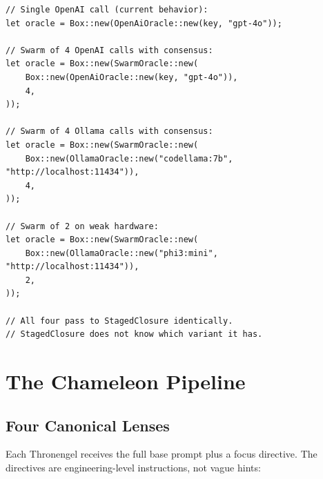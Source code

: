 \documentclass[11pt,a4paper]{article}
\begin{document}
\begin{lstlisting}[style=rust]
// Single OpenAI call (current behavior):
let oracle = Box::new(OpenAiOracle::new(key, "gpt-4o"));

// Swarm of 4 OpenAI calls with consensus:
let oracle = Box::new(SwarmOracle::new(
    Box::new(OpenAiOracle::new(key, "gpt-4o")),
    4,
));

// Swarm of 4 Ollama calls with consensus:
let oracle = Box::new(SwarmOracle::new(
    Box::new(OllamaOracle::new("codellama:7b", "http://localhost:11434")),
    4,
));

// Swarm of 2 on weak hardware:
let oracle = Box::new(SwarmOracle::new(
    Box::new(OllamaOracle::new("phi3:mini", "http://localhost:11434")),
    2,
));

// All four pass to StagedClosure identically.
// StagedClosure does not know which variant it has.
\end{lstlisting}


\section{The Chameleon Pipeline}
\label{sec:chameleon}

\subsection{Four Canonical Lenses}

Each Thronengel receives the full base prompt plus a focus directive. 
The directives are engineering-level instructions, not vague hints:
\end{document}

